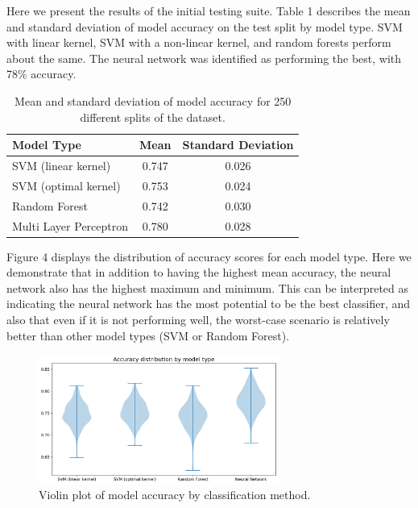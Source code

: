 \documentclass[12pt]{article}
\begin{document}
Here we present the results of the initial testing suite. Table 1 describes the mean and standard deviation of model accuracy on the test split by model type. SVM with linear kernel, SVM with a non-linear kernel, and random forests perform about the same. The neural network was identified as performing the best, with 78\% accuracy. 

\begin{table}[H]
\centering
\begin{tabular}{|l|c|c|}
\hline
\multicolumn{1}{|l|}{Model Type} & Mean & \multicolumn{1}{l|}{Standard Deviation} \\ \hline
SVM (linear kernel) & 0.747 & 0.026 \\
\hline
SVM (optimal kernel) & 0.753 & 0.024 \\
\hline
Random Forest & 0.742 & 0.030 \\
\hline
Multi Layer Perceptron & 0.780 & 0.028 \\
\hline
\end{tabular}
\caption{Mean and standard deviation of model accuracy for 250 different splits of the dataset.}
\end{table}

Figure 4 displays the distribution of accuracy scores for each model type. Here we demonstrate that in addition to having the highest mean accuracy, the neural network also has the highest maximum and minimum. This can be interpreted as indicating the neural network has the most potential to be the best classifier, and also that even if it is not performing well, the worst-case scenario is relatively better than other model types (SVM or Random Forest).

\begin{figure}[H]
\centering
\includegraphics[width=0.7\textwidth]{testOut}
\caption{Violin plot of model accuracy by classification method.}
\end{figure}
\end{document}
